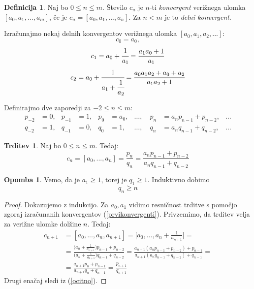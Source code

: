 \documentclass[a4paper,12pt]{article}
\theoremstyle{definition}
\newtheorem{df}{Definicija}[section]
\theoremstyle{proposition}
\newtheorem{trd}{Trditev}[section]
\theoremstyle{theorem}
\theoremstyle{lemma}
\newtheorem*{op}{Opomba}
\begin{document}
\begin{df}
Naj bo $0 \leq n \leq m$. Število $c_n$ je $n$-ti \textit{konvergent} 		verižnega ulomka $[a_0, a_1, ..., a_m]$, če je $c_n = [a_0, a_1, ..., a_n]$. Za $n < m$ je to \textit{delni konvergent}.
\end{df}

Izračunajmo nekaj delnih konvergentov verižnega ulomka $[a_0, a_1, a_2, ...]$: 
\begin{equation*}
c_0=a_0,
\end{equation*}
\begin{equation}
\label{prvikonvergenti}
c_1=a_0+\cfrac{1}{a_1}=\frac{a_1 a_0 + 1}{a_1}
\end{equation}
\begin{equation*}
c_2 = a_0 + \cfrac{1}{a_1 + \cfrac{1}{a_2}} =\frac{a_0 a_1 a_2 + a_0 + a_2}{a_1 a_2 + 1}
\end{equation*}

Definirajmo dve zaporedji za $-2\leq n \leq m$:
\begin{align*}
		p_{-2} &= 0, & p_{-1} &= 1, & p_0 &= a_0, & \dots, \quad p_n &= a_{n}p_{n-1} + p_{n-2}, & \dots \\
		q_{-2} &= 1, & q_{-1} &= 0, & q_0 &= 1, & \dots, \quad q_n &= a_{n}q_{n-1} + q_{n-2}, & \dots
\end{align*}
		
\begin{trd}
Naj bo $0\leq n \leq m$. Tedaj:
\begin{equation}
\label{pninqn}
c_n = [a_0, ..., a_n] = \frac{p_n}{q_n} = \frac{a_{n}p_{n-1} + p_{n-2}}{a_{n}q_{n-1} + q_{n-2}}
\end{equation}
\end{trd}

\begin{op}
Vemo, da je $a_1 \geq 1$, torej je $q_1 \geq 1$. Induktivno dobimo
\begin{equation}
\label{ocenaimenovalca}
q_n \geq n
\end{equation}
\end{op}

\begin{proof}
Dokazujemo z indukcijo. Za $a_0, a_1$ vidimo resničnost trditve s pomočjo zgoraj izračunanih konvergentov (\ref{prvikonvergenti}). Privzemimo, da trditev velja za verižne ulomke dolžine $n$. Tedaj:
\begin{equation*}
\begin{split}
c_{n+1}&=[a_0, ...,a_n, a_{n+1}]
= \Big[a_0, ..., a_n + \frac{1}{a_{n+1}}\Big] =\\
&= \frac{\big(a_n + \frac{1}{a_{n+1}}\big)p_{n-1}+p_{n-2}}{\big(a_n + \frac{1}{a_{n+1}}\big)q_{n-1}+q_{n-2}} =
\frac{a_{n+1}(a_n p_{n-1} + p_{n-2}) + p_{n-1}}{a_{n+1}(a_n q_{n-1} + q_{n-2}) + q_{n-1}} =\\
&=\frac{a_{n+1}p_n + p_{n-1}}{a_{n+1}q_n + q_{n-1}} = \frac{p_{n+1}}{q_{n+1}}
\end{split}
\end{equation*}
Drugi enačaj sledi iz (\ref{ocitno}).
\end{proof}
\end{document}
